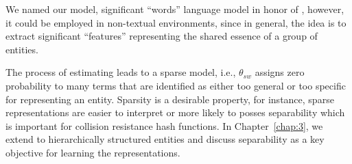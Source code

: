 We named our model, significant ``words'' language model in honor of \citeauthor{Luhn:1958}, however, it could be employed in non-textual environments, since in general, the idea is to extract significant ``features'' representing the shared essence of a group of entities.

\bigskip
The process of estimating \acswlm leads to a sparse model, i.e., $\theta_{sw}$ assigns zero probability to many terms that are identified as either too general or too specific for representing an entity. 
Sparsity is a desirable property, for instance, sparse representations are easier to interpret or more likely to posses separability which is important for collision resistance hash functions. 
In Chapter~\ref{chap:3}, we extend \acswlm to hierarchically structured entities and discuss separability as a key objective for learning the representations.